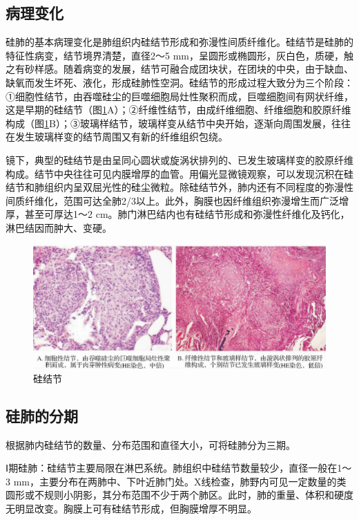 \subsection{病理变化}

硅肺的基本病理变化是肺组织内硅结节形成和弥漫性间质纤维化。硅结节是硅肺的特征性病变，结节境界清楚，直径2～5
mm，呈圆形或椭圆形，灰白色，质硬，触之有砂样感。随着病变的发展，结节可融合成团块状，在团块的中央，由于缺血、缺氧而发生坏死、液化，形成硅肺性空洞。硅结节的形成过程大致分为三个阶段：①细胞性结节，由吞噬硅尘的巨噬细胞局灶性聚积而成，巨噬细胞间有网状纤维，这是早期的硅结节（图\ref{fig7-14}A）；②纤维性结节，由成纤维细胞、纤维细胞和胶原纤维构成（图\ref{fig7-14}B）；③玻璃样结节，玻璃样变从结节中央开始，逐渐向周围发展，往往在发生玻璃样变的结节周围又有新的纤维组织包绕。

镜下，典型的硅结节是由呈同心圆状或旋涡状排列的、已发生玻璃样变的胶原纤维构成。结节中央往往可见内膜增厚的血管。用偏光显微镜观察，可以发现沉积在硅结节和肺组织内呈双屈光性的硅尘微粒。除硅结节外，肺内还有不同程度的弥漫性间质纤维化，范围可达全肺2/3以上。此外，胸膜也因纤维组织弥漫增生而广泛增厚，甚至可厚达1～2
cm。肺门淋巴结内也有硅结节形成和弥漫性纤维化及钙化，淋巴结因而肿大、变硬。

\begin{figure}[!htbp]
 \centering
 \includegraphics{./images/Image00123.jpg}
 \captionsetup{justification=centering}
 \caption{硅结节}
 \label{fig7-14}
  \end{figure} 

\subsection{硅肺的分期}

根据肺内硅结节的数量、分布范围和直径大小，可将硅肺分为三期。

Ⅰ期硅肺：硅结节主要局限在淋巴系统。肺组织中硅结节数量较少，直径一般在1～3
mm，主要分布在两肺中、下叶近肺门处。X线检查，肺野内可见一定数量的类圆形或不规则小阴影，其分布范围不少于两个肺区。此时，肺的重量、体积和硬度无明显改变。胸膜上可有硅结节形成，但胸膜增厚不明显。

